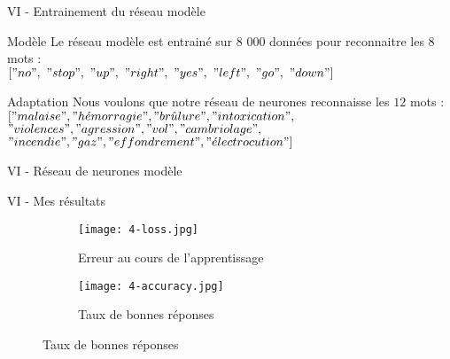\begin{frame}{VI - Entrainement du réseau modèle}
	\begin{block}{Modèle}
		Le réseau modèle est entrainé sur 8 000 données pour reconnaitre les $8$ mots : \\
		$["no",\ "stop",\ "up",\ "right",\ "yes",\ "left",\ "go",\ "down"]$ \\
	\end{block}
	\begin{exampleblock}{Adaptation}
		Nous voulons que notre réseau de neurones reconnaisse les $12$ mots : \\
		$["malaise", "h\acute{e}morragie", "br\hat{u}lure", "intoxication",$ \\
					$ "violences", "agression", "vol", "cambriolage",$ \\
					$ "incendie", "gaz", "effondrement", "\acute{e}lectrocution"]$
	\end{exampleblock}
	
\end{frame}


\begin{frame}{VI - Réseau de neurones modèle}
	
\end{frame}

\begin{frame}{VI - Mes résultats}
	\begin{figure}
		\begin{subfigure}[]{0.45\textwidth}
			\texttt{[image: 4-loss.jpg]}
			\caption{Erreur au cours de l'apprentissage}
		\end{subfigure}
		\begin{subfigure}[]{0.45\textwidth}
			\texttt{[image: 4-accuracy.jpg]}
			\caption{Taux de bonnes réponses}
		\end{subfigure}
	\end{figure}
\end{frame}

